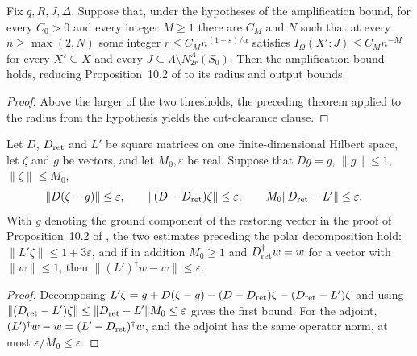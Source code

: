 \begin{lemma}
    \label{thm:area_law_amplification_of_radius_output}
    \leanok
    Fix $q,R,J,\Delta$. Suppose that, under the hypotheses of the amplification
    bound, for every $C_0>0$ and every integer $M\ge1$ there are $C_M$ and $N$
    such that at every $n\ge\max(2,N)$ some integer
    $r\le C_Mn^{(1-\varepsilon)/\alpha}$ satisfies $I_\Omega(X':J)\le C_Mn^{-M}$
    for every $X'\subseteq X$ and every
    $J\subseteq\Lambda\setminus N_{2r}^\Lambda(S_0)$. Then the amplification
    bound holds, reducing Proposition~10.2 of \cite{OpenAI2026AreaLaw} to its
    radius and output bounds.
\end{lemma}
\begin{proof}
    \leanok
    Above the larger of the two thresholds, the preceding theorem applied to the
    radius from the hypothesis yields the cut-clearance clause.
\end{proof}

\begin{lemma}
    \label{thm:area_law_amplification_before_polar}
    \leanok
    Let $D$, $D_{\rm ret}$ and $L'$ be square matrices on one finite-dimensional
    Hilbert space, let $\zeta$ and $g$ be vectors, and let $M_0,\varepsilon$ be
    real. Suppose that $Dg=g$, $\|g\|\le1$, $\|\zeta\|\le M_0$,
    \begin{align*}
        \|D(\zeta-g)\| & \le\varepsilon,
        \qquad
        \|(D-D_{\rm ret})\zeta\|\le\varepsilon,
        \qquad
        M_0\|D_{\rm ret}-L'\|\le\varepsilon.
    \end{align*}
    With $g$ denoting the ground component of the
    restoring vector in the proof of Proposition~10.2 of \cite{OpenAI2026AreaLaw}, the two estimates preceding the polar decomposition hold: $\|L'\zeta\|\le1+3\varepsilon$, and if in addition $M_0\ge1$ and
    $D_{\rm ret}^\dagger w=w$ for a vector with $\|w\|\le1$, then
    $\|(L')^\dagger w-w\|\le\varepsilon$.
\end{lemma}
\begin{proof}
    \leanok
    Decomposing
    $L'\zeta=g+D(\zeta-g)-(D-D_{\rm ret})\zeta-(D_{\rm ret}-L')\zeta$ and using
    $\|(D_{\rm ret}-L')\zeta\|\le\|D_{\rm ret}-L'\|M_0\le\varepsilon$ gives the first bound. For the
    adjoint, $(L')^\dagger w-w=(L'-D_{\rm ret})^\dagger w$, and the adjoint has
    the same operator norm, at most $\varepsilon/M_0\le\varepsilon$.
\end{proof}

